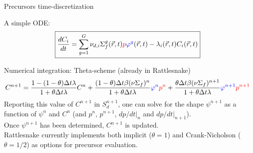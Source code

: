 \documentclass[8pt]{beamer}
\newcommand{\be}{\begin{equation}}
\newcommand{\ee}{\end{equation}}
\newcommand{\tcr}[1]{\textcolor{red}{#1}}
\newcommand{\tcb}[1]{\textcolor{blue}{#1}}
\begin{document}
\begin{frame}{Precursors time-discretization}

A simple ODE:
\begin{equation*}
\boxed{
\frac{dC_i}{dt} = \sum_{g=1}^G \nu_{d,i} \Sigma_f^g(\vec{r},t) \tcr{p} \tcb{\varphi^{g}}(\vec{r},t) - \lambda_i(\vec{r},t) C_i(\vec{r},t) 
}
\end{equation*}
\begin{block}{Numerical integration: Theta-scheme (already in Rattlesnake)}
\be
C^{n+1} = \frac{1-(1-\theta)\Delta t\lambda}{1+\theta\Delta t\lambda}C^n 
+ \frac{(1-\theta)\Delta t \beta (\nu\Sigma_f)^n}    {1+\theta\Delta t\lambda}\tcb{\varphi^n}     \tcr{p^n }
+ \frac{\theta\Delta t     \beta (\nu\Sigma_f)^{n+1}}{1+\theta\Delta t\lambda}\tcb{\varphi^{n+1}} \tcr{p^{n+1}}
\ee
Reporting this value of $C^{n+1}$ in $S_d^{n+1}$, one can solve for the shape $\psi^{n+1}$ as a function of $\psi^n$ and $C^n$
(and $p^n$, $p^{n+1}$, $dp/dt|_n$ and  $dp/dt|_{n+1}$).\\

\bigskip
Once $\psi^{n+1}$ has been determined, $C^{n+1}$ is updated. \\

\medskip
Rattlesnake currently implements both implicit ($\theta=1$) and Crank-Nicholson ($\theta=1/2$) as options for precursor evaluation.

\end{block}

\end{frame}
\end{document}
